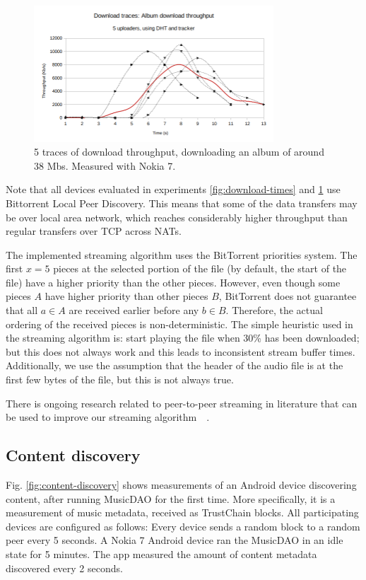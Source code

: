 \begin{figure}
    \centering
    \includegraphics[width=0.8\textwidth]{evaluation/download-traces.png}
    \caption{5 traces of download throughput, downloading an album of around 38 Mbs. Measured with Nokia 7.}
    \label{fig:download-traces}
\end{figure}

Note that all devices evaluated in experiments \ref{fig:download-times} and \ref{fig:download-traces} use Bittorrent Local Peer Discovery. This means that some of the data transfers may be over local area network, which reaches considerably higher throughput than regular transfers over TCP across NATs.

The implemented streaming algorithm uses the BitTorrent priorities system. The first $x=5$ pieces at the selected portion of the file (by default, the start of the file) have a higher priority than the other pieces. However, even though some pieces $A$ have higher priority than other pieces $B$, BitTorrent does not guarantee that all $a\in A$ are received earlier before any $b\in B$. Therefore, the actual ordering of the received pieces is non-deterministic. The simple heuristic used in the streaming algorithm is: start playing the file when 30\% has been downloaded; but this does not always work and this leads to inconsistent stream buffer times. Additionally, we use the assumption that the header of the audio file is at the first few bytes of the file, but this is not always true.

There is ongoing research related to peer-to-peer streaming in literature that can be used to improve our streaming algorithm~\citep{erman2008piece}~\citep{akkanen2017continuous}.

\subsection{Content discovery}
Fig. \ref{fig:content-discovery} shows measurements of an Android device discovering content, after running MusicDAO for the first time. More specifically, it is a measurement of music metadata, received as TrustChain blocks. All participating devices are configured as follows: Every device sends a random block to a random peer every 5 seconds. A Nokia 7 Android device ran the MusicDAO in an idle state for 5 minutes. The app measured the amount of content metadata discovered every 2 seconds. 

